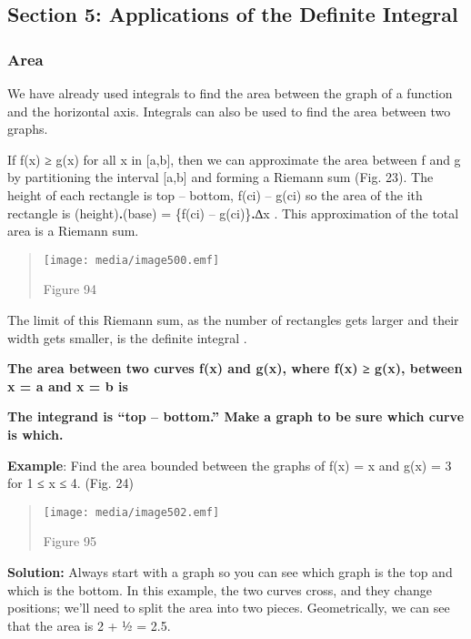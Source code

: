 \hypertarget{section-5-applications-of-the-definite-integral}{\subsection{Section
5: Applications of the Definite
Integral}\label{section-5-applications-of-the-definite-integral}}

\subsubsection{Area}\label{area-1}

We have already used integrals to find the area between the graph of a
function and the horizontal axis. Integrals can also be used to find the
area between two graphs.

If f(x) ≥ g(x) for all x in {[}a,b{]}, then we can approximate the area
between f and g by partitioning the interval {[}a,b{]} and forming a
Riemann sum (Fig. 23). The height of each rectangle is top -- bottom,
f(ci) -- g(ci) so the area of the ith rectangle is
(height)\textbf{.}(base) = \{f(ci) -- g(ci)\}\textbf{.}∆x . This
approximation of the total area is a Riemann sum.

\begin{quote}
\texttt{[image: media/image500.emf]}

Figure 94
\end{quote}

The limit of this Riemann sum, as the number of rectangles gets larger
and their width gets smaller, is the definite integral .

\textbf{The area between two curves f(x) and g(x), where f(x) ≥ g(x),
between x = a and x = b is}

\textbf{The integrand is ``top -- bottom.'' Make a graph to be sure
which curve is which.}

\textbf{Example}: Find the area bounded between the graphs of f(x) = x
and g(x) = 3 for 1 ≤ x ≤ 4. (Fig. 24)

\begin{quote}
\texttt{[image: media/image502.emf]}

Figure 95
\end{quote}

\textbf{Solution:} Always start with a graph so you can see which graph
is the top and which is the bottom. In this example, the two curves
cross, and they change positions; we'll need to split the area into two
pieces. Geometrically, we can see that the area is 2 + ½ = 2.5.

